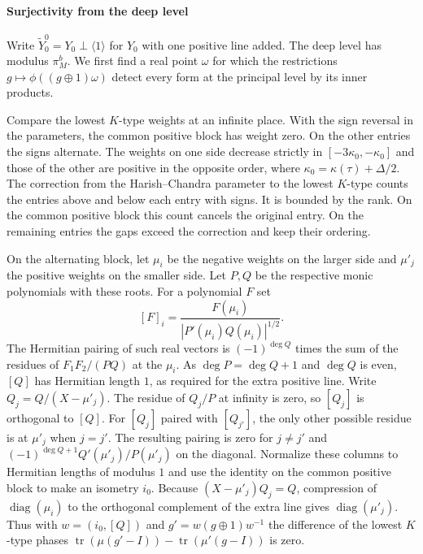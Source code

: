 \paragraph{Surjectivity from the deep level}
Write \(\widetilde Y_0^0=Y_0\perp\langle1\rangle\) for \(Y_0\) with one
positive line added. The deep level has modulus \(\pi_M^b\).
We first find a real point \(\omega\) for which the restrictions
\(g\mapsto\phi((g\oplus1)\omega)\) detect every form at the principal level
by its inner products.

Compare the lowest \(K\)-type weights at an infinite place.
With the sign reversal in the parameters, the common positive block
has weight zero. On the other entries the signs alternate. The weights
on one side decrease strictly in \([-3\kappa_0,-\kappa_0]\) and those of
the other are positive in the opposite order, where
\(\kappa_0=\kappa(\tau)+\Delta/2\).
The correction from the Harish--Chandra parameter to the lowest
\(K\)-type counts the entries above and below each entry with signs.
It is bounded by the rank. On the common positive block this count
cancels the original entry. On the remaining entries the gaps exceed
the correction and keep their ordering.

On the alternating block, let \(\mu_i\) be the negative weights on the
larger side and \(\mu'_j\) the positive weights on the smaller side.
Let \(P,Q\) be the respective monic polynomials with these roots.
For a polynomial \(F\) set
\[
 [F]_i=\frac{F(\mu_i)}{|P'(\mu_i)Q(\mu_i)|^{1/2}} .
\]
The Hermitian pairing of such real vectors is \((-1)^{\deg Q}\) times
the sum of the residues of \(F_1F_2/(PQ)\) at the \(\mu_i\).
As \(\deg P=\deg Q+1\) and \(\deg Q\) is even, \([Q]\) has Hermitian
length \(1\), as required for the extra positive line.
Write \(Q_j=Q/(X-\mu'_j)\). The residue of \(Q_j/P\) at infinity is zero,
so \([Q_j]\) is orthogonal to \([Q]\).
For \([Q_j]\) paired with \([Q_{j'}]\), the only other possible residue
is at \(\mu'_j\) when \(j=j'\). The resulting pairing is zero for
\(j\ne j'\) and \((-1)^{\deg Q+1}Q'(\mu'_j)/P(\mu'_j)\) on the diagonal.
Normalize these columns to Hermitian lengths of modulus \(1\) and
use the identity on the common positive block to make an isometry \(i_0\).
Because \((X-\mu'_j)Q_j=Q\), compression of
\(\operatorname{diag}(\mu_i)\) to the orthogonal complement of the
extra line gives \(\operatorname{diag}(\mu'_j)\).
Thus with \(w=(i_0,[Q])\) and \(g'=w(g\oplus1)w^{-1}\) the difference
of the lowest \(K\)-type phases
\(\operatorname{tr}(\mu(g'-I))-\operatorname{tr}(\mu'(g-I))\)
is zero.

